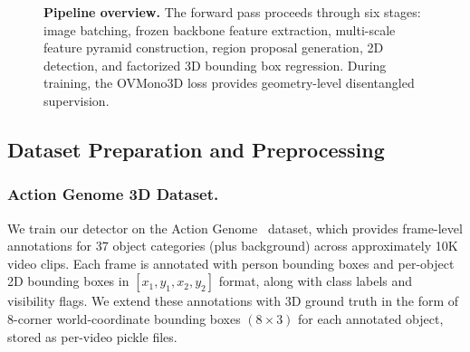 \documentclass[runningheads]{llncs}
\begin{document}
\begin{figure}[t]
\centering
{}
\caption{\textbf{Pipeline overview.} The forward pass proceeds through six stages: image batching, frozen backbone feature extraction, multi-scale feature pyramid construction, region proposal generation, 2D detection, and factorized 3D bounding box regression. During training, the OVMono3D loss provides geometry-level disentangled supervision.}
\label{fig:pipeline_overview}
\end{figure}


\subsection{Dataset Preparation and Preprocessing}
\label{sec:dataset}

\subsubsection{Action Genome 3D Dataset.}
We train our detector on the Action Genome~\cite{ji2020actiongenome} dataset, which provides frame-level annotations for 37 object categories (plus background) across approximately 10K video clips.
Each frame is annotated with person bounding boxes and per-object 2D bounding boxes in $[x_1, y_1, x_2, y_2]$ format, along with class labels and visibility flags.
We extend these annotations with 3D ground truth in the form of 8-corner world-coordinate bounding boxes $(8 \times 3)$ for each annotated object, stored as per-video pickle files.
\end{document}
